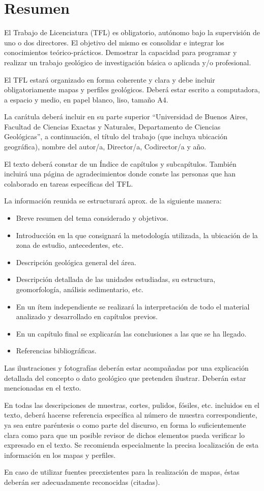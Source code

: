 \chapter*{Resumen}
El Trabajo de Licenciatura (TFL) es obligatorio, autónomo bajo la supervisión de uno o dos directores. El objetivo del mismo es consolidar e integrar los conocimientos teórico-prácticos. Demostrar la capacidad para programar y realizar un trabajo geológico de investigación básica o aplicada y/o profesional.\par
El TFL estará organizado en forma coherente y clara y debe incluir obligatoriamente mapas y perfiles geológicos. Deberá estar escrito a computadora, a espacio y medio, en papel blanco, liso, tamaño A4.\par
La carátula deberá incluir en su parte superior “Universidad de Buenos Aires, Facultad de Ciencias Exactas y Naturales, Departamento de Ciencias Geológicas”, a continuación, el título del trabajo (que incluya ubicación geográfica), nombre del autor/a, Director/a, Codirector/a y año.\par
El texto deberá constar de un Índice de capítulos y subcapítulos. También incluirá una página de agradecimientos donde conste las personas que han colaborado en tareas específicas del TFL.\par
La información reunida se estructurará aprox. de la siguiente manera:
\begin{itemize}
    \item Breve resumen del tema considerado y objetivos.
    \item Introducción en la que consignará la metodología utilizada, la ubicación de la zona de estudio, antecedentes, etc.
    \item Descripción geológica general del área.
    \item Descripción detallada de las unidades estudiadas, su estructura, geomorfología, análisis sedimentario, etc.
    \item En un ítem independiente se realizará la interpretación de todo el material analizado y desarrollado en capítulos previos.
    \item En un capítulo final se explicarán las conclusiones a las que se ha llegado.
    \item Referencias bibliográficas.
\end{itemize}

Las ilustraciones y fotografías deberán estar acompañadas por una explicación detallada del concepto o dato geológico que pretenden ilustrar. Deberán estar mencionadas en el texto.\par
En todas las descripciones de muestras, cortes, pulidos, fósiles, etc. incluidos en el texto, deberá hacerse referencia específica al número de muestra correspondiente, ya sea entre paréntesis o como parte del discurso, en forma lo suficientemente clara como para que un posible revisor de dichos elementos pueda verificar lo expresado en el texto. Se recomienda especialmente la precisa localización de esta información en los mapas y perfiles.\par
En caso de utilizar fuentes preexistentes para la realización de mapas, éstas deberán ser adecuadamente reconocidas (citadas).\par
\clearpage

